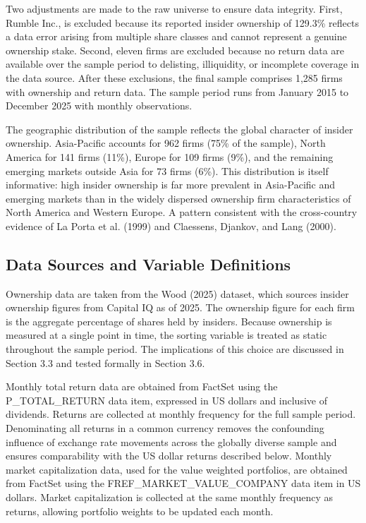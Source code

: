 Two adjustments are made to the raw universe to ensure data integrity. First, Rumble Inc., is excluded because its reported insider ownership of 129.3\% reflects a data error arising from multiple share classes and cannot represent a genuine ownership stake. Second, eleven firms are excluded because no return data are available over the sample period to delisting, illiquidity, or incomplete coverage in the data source. After these exclusions, the final sample comprises 1,285 firms with ownership and return data. The sample period runs from January 2015 to December 2025 with monthly observations.

The geographic distribution of the sample reflects the global character of insider ownership. Asia-Pacific accounts for 962 firms (75\% of the sample), North America for 141 firms (11\%), Europe for 109 firms (9\%), and the remaining emerging markets outside Asia for 73 firms (6\%). This distribution is itself informative: high insider ownership is far more prevalent in Asia-Pacific and emerging markets than in the widely dispersed ownership firm characteristics of North America and Western Europe. A pattern consistent with the cross-country evidence of La Porta et al. (1999) and Claessens, Djankov, and Lang (2000).


\subsection{Data Sources and Variable Definitions}

Ownership data are taken from the Wood (2025) dataset, which sources insider ownership figures from Capital IQ as of 2025. The ownership figure for each firm is the aggregate percentage of shares held by insiders. Because ownership is measured at a single point in time, the sorting variable is treated as static throughout the sample period. The implications of this choice are discussed in Section 3.3 and tested formally in Section 3.6.

Monthly total return data are obtained from FactSet using the P\_TOTAL\_RETURN data item, expressed in US dollars and inclusive of dividends. Returns are collected at monthly frequency for the full sample period. Denominating all returns in a common currency removes the confounding influence of exchange rate movements across the globally diverse sample and ensures comparability with the US dollar returns described below. Monthly market capitalization data, used for the value weighted portfolios, are obtained from FactSet using the FREF\_MARKET\_VALUE\_COMPANY data item in US dollars. Market capitalization is collected at the same monthly frequency as returns, allowing portfolio weights to be updated each month.

